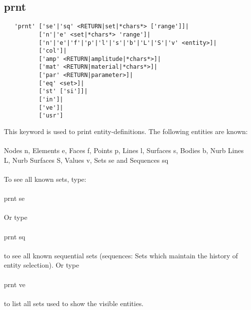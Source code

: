 \documentclass{article}
\begin{document}
\subsection{\label{prnt}prnt}
\begin{verbatim}
   'prnt' ['se'|'sq' <RETURN|set|*chars*> ['range']]|
          ['n'|'e' <set|*chars*> 'range']| 
          ['n'|'e'|'f'|'p'|'l'|'s'|'b'|'L'|'S'|'v' <entity>]| 
          ['col']|
          ['amp' <RETURN|amplitude|*chars*>]|
          ['mat' <RETURN|material|*chars*>]|
          ['par' <RETURN|parameter>]|
          ['eq' <set>]|
          ['st' ['si']]|
          ['in']|
          ['ve']|
          ['usr']
\end{verbatim}
This keyword is used to print entity-definitions. The following entities are known:\\\\
Nodes n, Elements e, Faces f, Points p, Lines l, Surfaces s, Bodies b, Nurb
Lines L, Nurb Surfaces S, Values v, Sets se and Sequences sq\\\\To see all
known sets, type:\\\\prnt se\\\\Or type\\\\prnt sq\\\\to see all known
sequential sets (sequences: Sets which maintain the history of entity selection). Or type\\\\prnt ve\\\\to list all sets used to show the visible entities.
\end{document}

